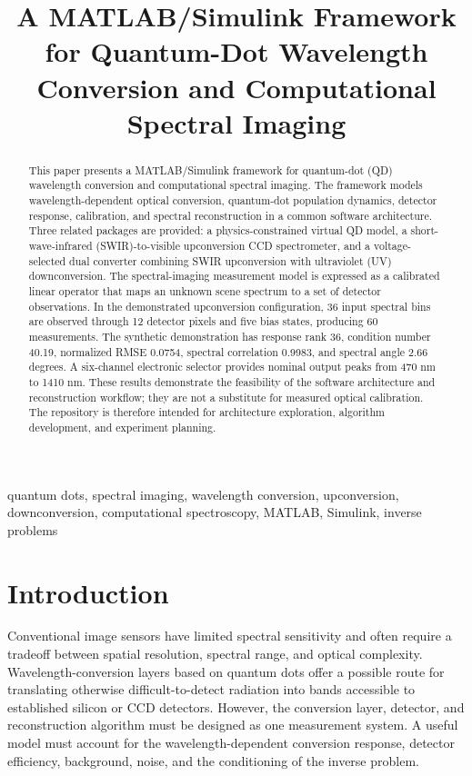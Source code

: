 \documentclass[conference]{IEEEtran}
\title{A MATLAB/Simulink Framework for Quantum-Dot Wavelength Conversion and Computational Spectral Imaging}
\author{\IEEEauthorblockN{Jyothi Prakash}
\IEEEauthorblockA{Independent Researcher\\
GitHub: \url{https://github.com/jyothiprakash392/quantum-dot-spectral-imaging}}}
\begin{document}
\maketitle

\begin{abstract}
This paper presents a MATLAB/Simulink framework for quantum-dot (QD) wavelength conversion and computational spectral imaging. The framework models wavelength-dependent optical conversion, quantum-dot population dynamics, detector response, calibration, and spectral reconstruction in a common software architecture. Three related packages are provided: a physics-constrained virtual QD model, a short-wave-infrared (SWIR)-to-visible upconversion CCD spectrometer, and a voltage-selected dual converter combining SWIR upconversion with ultraviolet (UV) downconversion. The spectral-imaging measurement model is expressed as a calibrated linear operator that maps an unknown scene spectrum to a set of detector observations. In the demonstrated upconversion configuration, 36 input spectral bins are observed through 12 detector pixels and five bias states, producing 60 measurements. The synthetic demonstration has response rank 36, condition number 40.19, normalized RMSE 0.0754, spectral correlation 0.9983, and spectral angle 2.66 degrees. A six-channel electronic selector provides nominal output peaks from 470 nm to 1410 nm. These results demonstrate the feasibility of the software architecture and reconstruction workflow; they are not a substitute for measured optical calibration. The repository is therefore intended for architecture exploration, algorithm development, and experiment planning.
\end{abstract}

\begin{IEEEkeywords}
quantum dots, spectral imaging, wavelength conversion, upconversion, downconversion, computational spectroscopy, MATLAB, Simulink, inverse problems
\end{IEEEkeywords}

\section{Introduction}
Conventional image sensors have limited spectral sensitivity and often require a tradeoff between spatial resolution, spectral range, and optical complexity. Wavelength-conversion layers based on quantum dots offer a possible route for translating otherwise difficult-to-detect radiation into bands accessible to established silicon or CCD detectors. However, the conversion layer, detector, and reconstruction algorithm must be designed as one measurement system. A useful model must account for the wavelength-dependent conversion response, detector efficiency, background, noise, and the conditioning of the inverse problem.
\end{document}

